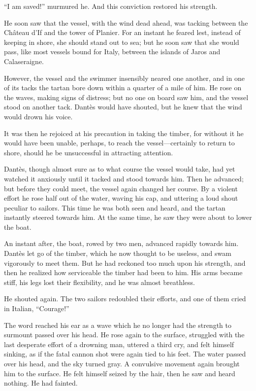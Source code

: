 “I am saved!” murmured he. And this conviction restored his strength.

He soon saw that the vessel, with the wind dead ahead, was tacking
between the Château d’If and the tower of Planier. For an instant he
feared lest, instead of keeping in shore, she should stand out to sea;
but he soon saw that she would pass, like most vessels bound for Italy,
between the islands of Jaros and Calaseraigne.

However, the vessel and the swimmer insensibly neared one another, and
in one of its tacks the tartan bore down within a quarter of a mile of
him. He rose on the waves, making signs of distress; but no one on
board saw him, and the vessel stood on another tack. Dantès would have
shouted, but he knew that the wind would drown his voice.

It was then he rejoiced at his precaution in taking the timber, for
without it he would have been unable, perhaps, to reach the
vessel—certainly to return to shore, should he be unsuccessful in
attracting attention.

Dantès, though almost sure as to what course the vessel would take, had
yet watched it anxiously until it tacked and stood towards him. Then he
advanced; but before they could meet, the vessel again changed her
course. By a violent effort he rose half out of the water, waving his
cap, and uttering a loud shout peculiar to sailors. This time he was
both seen and heard, and the tartan instantly steered towards him. At
the same time, he saw they were about to lower the boat.

An instant after, the boat, rowed by two men, advanced rapidly towards
him. Dantès let go of the timber, which he now thought to be useless,
and swam vigorously to meet them. But he had reckoned too much upon his
strength, and then he realized how serviceable the timber had been to
him. His arms became stiff, his legs lost their flexibility, and he was
almost breathless.

He shouted again. The two sailors redoubled their efforts, and one of
them cried in Italian, “Courage!”

The word reached his ear as a wave which he no longer had the strength
to surmount passed over his head. He rose again to the surface,
struggled with the last desperate effort of a drowning man, uttered a
third cry, and felt himself sinking, as if the fatal cannon shot were
again tied to his feet. The water passed over his head, and the sky
turned gray. A convulsive movement again brought him to the surface. He
felt himself seized by the hair, then he saw and heard nothing. He had
fainted.

